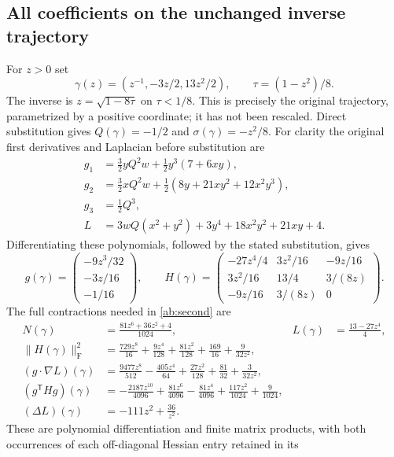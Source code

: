 \subsection{All coefficients on the unchanged inverse trajectory}

For $z>0$ set
\[
 \gamma(z)=(z^{-1},-3z/2,13z^2/2),\qquad
 \tau=(1-z^2)/8.
\]
The inverse is $z=\sqrt{1-8\tau}$ on $\tau<1/8$.
This is precisely the original trajectory, parametrized by a positive
coordinate; it has not been rescaled. Direct substitution gives
$Q(\gamma)=-1/2$ and $\sigma(\gamma)=-z^2/8$.
For clarity the original first derivatives and Laplacian before
substitution are
\begin{align*}
 g_1&=\tfrac32yQ^2w+\tfrac12y^3(7+6xy),\\
 g_2&=\tfrac32xQ^2w+\tfrac12(8y+21xy^2+12x^2y^3),\\
 g_3&=\tfrac12Q^3,\\
 L&=3wQ(x^2+y^2)+3y^4+18x^2y^2+21xy+4.
\end{align*}
Differentiating these polynomials, followed by the stated substitution,
gives
\[
 g(\gamma)=
 \begin{pmatrix}-9z^3/32\\-3z/16\\-1/16\end{pmatrix},
 \qquad
 H(\gamma)=
 \begin{pmatrix}
 -27z^4/4&3z^2/16&-9z/16\\
 3z^2/16&13/4&3/(8z)\\
 -9z/16&3/(8z)&0
 \end{pmatrix}.
\]
The full contractions needed in \eqref{ab:second} are
\begin{align*}
 N(\gamma)&=\frac{81z^6+36z^2+4}{1024},&
 L(\gamma)&=\frac{13-27z^4}{4},\\
 \lVert H(\gamma)\rVert_{\mathrm F}^2
 &=\frac{729z^8}{16}+\frac{9z^4}{128}
       +\frac{81z^2}{128}+\frac{169}{16}+\frac9{32z^2},\\
 (g\cdot\nabla L)(\gamma)
 &=\frac{9477z^8}{512}-\frac{405z^4}{64}
       +\frac{27z^2}{128}+\frac{81}{32}+\frac3{32z^2},\\
 (g^{\mathsf T}Hg)(\gamma)
 &=-\frac{2187z^{10}}{4096}+\frac{81z^6}{4096}
       -\frac{81z^4}{4096}+\frac{117z^2}{1024}+\frac9{1024},\\
 (\Delta L)(\gamma)&=-111z^2+\frac{36}{z^2}.
\end{align*}
These are polynomial differentiation and finite matrix products, with
both occurrences of each off-diagonal Hessian entry retained in its
